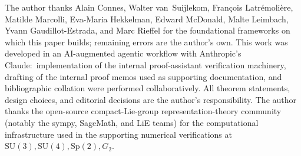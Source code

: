 \documentclass[11pt,a4paper]{article}
\theoremstyle{plain}
\theoremstyle{definition}
\newcommand{\SU}{\mathrm{SU}}
\newcommand{\Sp}{\mathrm{Sp}}
\begin{document}
The author thanks Alain Connes, Walter van~Suijlekom, Fran\c{c}ois
Latr\'emoli\`ere, Matilde Marcolli, Eva-Maria Hekkelman, Edward McDonald,
Malte Leimbach, Yvann Gaudillot-Estrada, and Marc Rieffel for the
foundational frameworks on which this paper builds; remaining errors
are the author's own. This work was developed in an AI-augmented
agentic workflow with Anthropic's Claude:\ implementation of the
internal proof-assistant verification machinery, drafting of the
internal proof memos used as supporting documentation, and
bibliographic collation were performed collaboratively. All theorem
statements, design choices, and editorial decisions are the author's
responsibility. The author thanks the open-source compact-Lie-group
representation-theory community (notably the sympy, SageMath, and
LiE teams) for the computational infrastructure used in the supporting
numerical verifications at $\SU(3), \SU(4), \Sp(2), G_2$.
\end{document}
